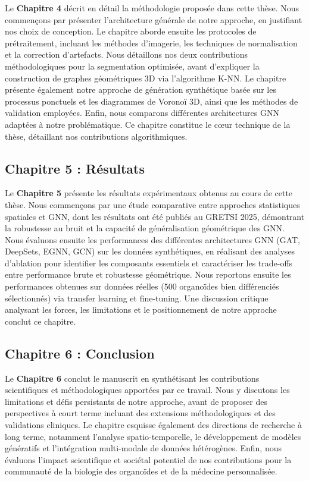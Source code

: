 Le \textbf{Chapitre 4} décrit en détail la méthodologie proposée dans cette thèse. Nous commençons par présenter l'architecture générale de notre approche, en justifiant nos choix de conception. Le chapitre aborde ensuite les protocoles de prétraitement, incluant les méthodes d'imagerie, les techniques de normalisation et la correction d'artefacts. Nous détaillons nos deux contributions méthodologiques pour la segmentation optimisée, avant d'expliquer la construction de graphes géométriques 3D via l'algorithme K-NN. Le chapitre présente également notre approche de génération synthétique basée sur les processus ponctuels et les diagrammes de Voronoï 3D, ainsi que les méthodes de validation employées. Enfin, nous comparons différentes architectures GNN adaptées à notre problématique. Ce chapitre constitue le cœur technique de la thèse, détaillant nos contributions algorithmiques.

\subsection{Chapitre 5 : Résultats}

Le \textbf{Chapitre 5} présente les résultats expérimentaux obtenus au cours de cette thèse. Nous commençons par une étude comparative entre approches statistiques spatiales et GNN, dont les résultats ont été publiés au GRETSI 2025, démontrant la robustesse au bruit et la capacité de généralisation géométrique des GNN. Nous évaluons ensuite les performances des différentes architectures GNN (GAT, DeepSets, EGNN, GCN) sur les données synthétiques, en réalisant des analyses d'ablation pour identifier les composants essentiels et caractériser les trade-offs entre performance brute et robustesse géométrique. Nous reportons ensuite les performances obtenues sur données réelles (500 organoïdes bien différenciés sélectionnés) via transfer learning et fine-tuning. Une discussion critique analysant les forces, les limitations et le positionnement de notre approche conclut ce chapitre.

\subsection{Chapitre 6 : Conclusion}

Le \textbf{Chapitre 6} conclut le manuscrit en synthétisant les contributions scientifiques et méthodologiques apportées par ce travail. Nous y discutons les limitations et défis persistants de notre approche, avant de proposer des perspectives à court terme incluant des extensions méthodologiques et des validations cliniques. Le chapitre esquisse également des directions de recherche à long terme, notamment l'analyse spatio-temporelle, le développement de modèles génératifs et l'intégration multi-modale de données hétérogènes. Enfin, nous évaluons l'impact scientifique et sociétal potentiel de nos contributions pour la communauté de la biologie des organoïdes et de la médecine personnalisée.

